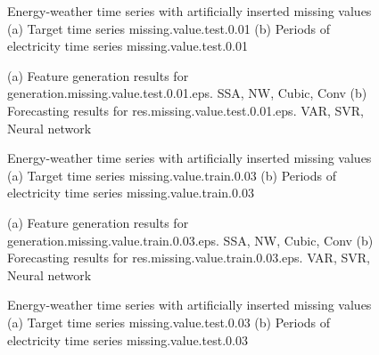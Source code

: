 \documentclass[12pt]{article}
\begin{document}
\begin{figure}
\centering
{}
\caption{Energy-weather time series with artificially inserted missing values	(a) Target time series	missing.value.test.0.01	(b) Periods of electricity time series	missing.value.test.0.01	}
\end{figure}


\begin{figure}
\centering
{}
\caption{(a)	Feature generation results for	generation.missing.value.test.0.01.eps.	SSA, NW, Cubic, Conv	(b)	Forecasting results for	res.missing.value.test.0.01.eps.	VAR, SVR, Neural network	}
\end{figure}


\begin{figure}
\centering
{}
\caption{Energy-weather time series with artificially inserted missing values	(a) Target time series	missing.value.train.0.03	(b) Periods of electricity time series	missing.value.train.0.03	}
\end{figure}


\begin{figure}
\centering
{}
\caption{(a)	Feature generation results for	generation.missing.value.train.0.03.eps.	SSA, NW, Cubic, Conv	(b)	Forecasting results for	res.missing.value.train.0.03.eps.	VAR, SVR, Neural network	}
\end{figure}


\begin{figure}
\centering
{}
\caption{Energy-weather time series with artificially inserted missing values	(a) Target time series	missing.value.test.0.03	(b) Periods of electricity time series	missing.value.test.0.03	}
\end{figure}
\end{document}
